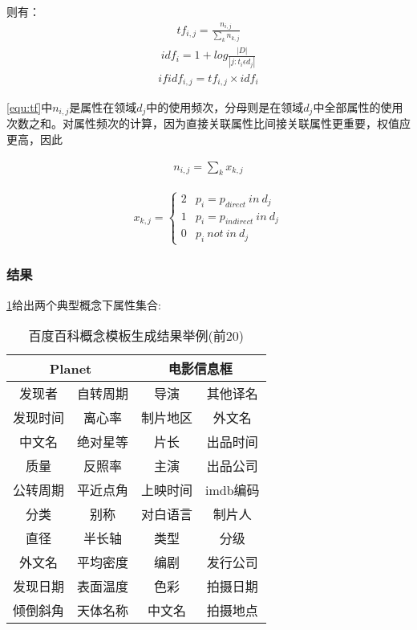 则有：
\begin{align}
\label{equ:tf}
tf_{i,j}=\frac{n_{i,j}}{\sum_{k}{n_{k,j}}}
\end{align}
\begin{align}
\label{equ:idf}
idf_{i}=1+log\frac{\left | D \right |}{\left | j:t_i  \epsilon d_j \right |}
\end{align}
\begin{align}
\label{equ:tfidf}
ifidf_{i,j}=tf_{i,j}\times idf_{i}
\end{align}

\ref{equ:tf}中$n_{i,j}$是属性在领域$d_{j}$中的使用频次，分母则是在领域$d_{j}$中全部属性的使用次数之和。对属性频次的计算，因为直接关联属性比间接关联属性更重要，权值应更高，因此

\begin{align}
n_{i,j} = {\sum_{k}{x_{k,j}}}
\end{align}

\begin{align}
x_{k,j} =
\left\{\begin{matrix}
2 & p_i = p_{direct} \ in \ d_j\\
1 & p_i = p_{indirect} \ in \ d_j\\
0 & p_i \ not \ in \ d_j
\end{matrix}\right.
\end{align}

\subsubsection{结果}
\ref{tab:baidu-template-examples}给出两个典型概念下属性集合:

\begin{table}[htb]
  \centering
  \caption{百度百科概念模板生成结果举例(前20)}
  \label{tab:baidu-template-examples}
    \begin{tabular}{cccc}
      \toprule[1.5pt]
         \multicolumn{2}{c}{Planet} & \multicolumn{2}{c}{电影信息框}\\ \midrule[1pt]
         发现者   &  自转周期  & 导演     & 其他译名 \\
         发现时间 &  离心率    & 制片地区 & 外文名   \\
         中文名   &  绝对星等  & 片长     & 出品时间 \\
         质量     &  反照率    & 主演     & 出品公司 \\
         公转周期 &  平近点角  & 上映时间 & imdb编码 \\
         分类     &  别称      & 对白语言 & 制片人   \\
         直径     &  半长轴    & 类型     & 分级     \\
         外文名   &  平均密度  & 编剧     & 发行公司 \\
         发现日期 &  表面温度  & 色彩     & 拍摄日期 \\
         倾倒斜角 &  天体名称  & 中文名   & 拍摄地点 \\
      \bottomrule[1.5pt]
    \end{tabular}
\end{table}



